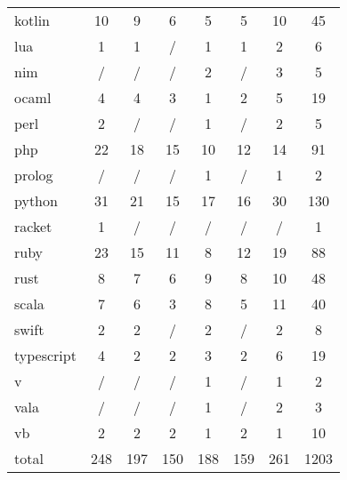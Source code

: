 \begin{table*}
\begin{tabular}{l|c|c|c|c|c|c|c}
        kotlin      & 10  & 9     & 6      & 5         & 5       & 10   & 45    \\
        lua         & 1   & 1     & /      & 1         & 1       & 2    & 6     \\
        nim         & /   & /     & /      & 2         & /       & 3    & 5     \\
        ocaml       & 4   & 4     & 3      & 1         & 2       & 5    & 19    \\
        perl        & 2   & /     & /      & 1         & /       & 2    & 5     \\
        php         & 22  & 18    & 15     & 10        & 12      & 14   & 91    \\
        prolog      & /   & /     & /      & 1         & /       & 1    & 2     \\
        python      & 31  & 21    & 15     & 17        & 16      & 30   & 130   \\
        racket      & 1   & /     & /      & /         & /       & /    & 1     \\
        ruby        & 23  & 15    & 11     & 8         & 12      & 19   & 88    \\
        rust        & 8   & 7     & 6      & 9         & 8       & 10   & 48    \\
        scala       & 7   & 6     & 3      & 8         & 5       & 11   & 40    \\
        swift       & 2   & 2     & /      & 2         & /       & 2    & 8     \\
        typescript  & 4   & 2     & 2      & 3         & 2       & 6    & 19    \\
        v           & /   & /     & /      & 1         & /       & 1    & 2     \\
        vala        & /   & /     & /      & 1         & /       & 2    & 3     \\
        vb          & 2   & 2     & 2      & 1         & 2       & 1    & 10    \\
        \midrule
        total       & 248 & 197   & 150    & 188       & 159     & 261  & 1203  \\
        \bottomrule
    \end{tabular}

\end{table*}